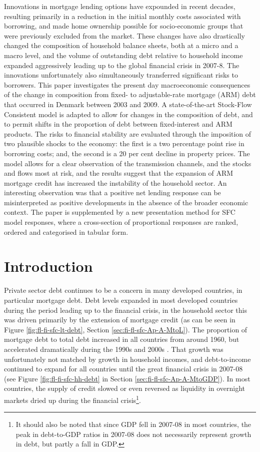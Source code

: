 \documentclass[
]{book}
\begin{document}
Innovations in mortgage lending options have expounded in recent decades, resulting primarily in a reduction in the initial monthly costs associated with borrowing, and made home ownership possible for socio-economic groups that were previously excluded from the market. These changes have also drastically changed the composition of household balance sheets, both at a micro and a macro level, and the volume of outstanding debt relative to household income expanded aggressively leading up to the global financial crisis in 2007-8. The innovations unfortunately also simultaneously transferred significant risks to borrowers. This paper investigates the present day macroeconomic consequences of the change in composition from fixed- to adjustable-rate mortgage (ARM) debt that occurred in Denmark between 2003 and 2009. A state-of-the-art Stock-Flow Consistent model is adapted to allow for changes in the composition of debt, and to permit shifts in the proportion of debt between fixed-interest and ARM products. The risks to financial stability are evaluated through the imposition of two plausible shocks to the economy: the first is a two percentage point rise in borrowing costs; and, the second is a 20 per cent decline in property prices. The model allows for a clear observation of the transmission channels, and the stocks and flows most at risk, and the results suggest that the expansion of ARM mortgage credit has increased the instability of the household sector. An interesting observation was that a positive net lending response can be misinterpreted as positive developments in the absence of the broader economic context. The paper is supplemented by a new presentation method for SFC model responses, where a cross-section of proportional responses are ranked, ordered and categorised in tabular form.

\hypertarget{sec:fi-fl-sfc-intro}{%
\section{Introduction}\label{sec:fi-fl-sfc-intro}}

Private sector debt continues to be a concern in many developed countries, in particular mortgage debt. Debt levels expanded in most developed countries during the period leading up to the financial crisis, in the household sector this was driven primarily by the extension of mortgage credit (as can be seen in Figure \ref{fig:fl-fi-sfc-lt-debt}, Section \ref{sec:fi-fl-sfc-Ap-A-MtoL}). The proportion of mortgage debt to total debt increased in all countries from around 1960, but accelerated dramatically during the 1990s and 2000s \citep{jorda2017macrofinancial}. That growth was unfortunately not matched by growth in household incomes, and debt-to-income continued to expand for all countries until the great financial crisis in 2007-08 (see Figure \ref{fig:fl-fi-sfc-hh-debt} in Section \ref{sec:fi-fl-sfc-Ap-A-MtoGDP}). In most countries, the supply of credit slowed or even reversed as liquidity in overnight markets dried up during the financial crisis\footnote{It should also be noted that since GDP fell in 2007-08 in most countries, the peak in debt-to-GDP ratios in 2007-08 does not necessarily represent growth in debt, but partly a fall in GDP.}.
\end{document}
